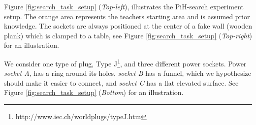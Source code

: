 \documentclass[final,3p,times,twocolumn]{elsarticle}
\begin{document}


%
%
%

%
%



Figure \ref{fig:search_task_setup} (\textit{Top-left}), illustrates the PiH-search experiment setup. The orange area represents 
the teachers starting area and is assumed prior knowledge. The sockets are always positioned at the center of a fake wall (wooden plank) which is clamped to a table, see 
Figure \ref{fig:search_task_setup} (\textit{Top-right}) for an illustration. 

We consider one type of plug, Type J\footnote{http://www.iec.ch/worldplugs/typeJ.htm}, and three different power sockets. 
Power \textit{socket A}, has a ring around its holes, \textit{socket B} has a funnel, which we hypothesize should make 
it easier to connect, and \textit{socket C} has a flat elevated surface. See Figure \ref{fig:search_task_setup}
(\textit{Bottom}) for an illustration. 
\end{document}
